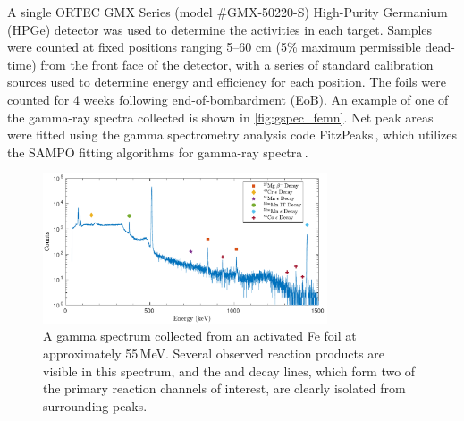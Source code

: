 A single 
ORTEC GMX Series (model \#GMX-50220-S)  High-Purity Germanium (HPGe) detector was used to determine the activities in each target.
Samples were counted at fixed positions ranging 5--60  cm (5\% maximum permissible dead-time) from the front face of the detector, with a series of standard calibration sources used to determine energy and efficiency for each position.
The foils were counted  for 
4 weeks following end-of-bombardment (EoB).
An example of one of the gamma-ray spectra collected 
is shown in \autoref{fig:gspec_femn}.
Net peak areas were fitted using the gamma spectrometry analysis code FitzPeaks\,\cite{fitzgerald2009fitzpeaks}, which utilizes the SAMPO fitting algorithms for gamma-ray spectra\,\cite{Aarnio2001}.

\begin{figure}
 \centering
 \includegraphics[width=0.75\textwidth]{./figures/sample_gspec_fe.pdf}
 \caption{A gamma spectrum collected from an activated Fe foil at approximately 55\,MeV. Several observed reaction products are visible in this spectrum, and  the  and  decay lines, which form two of the   primary reaction channels of interest, are  clearly isolated from surrounding peaks. }
 \label{fig:gspec_femn}
\end{figure}

